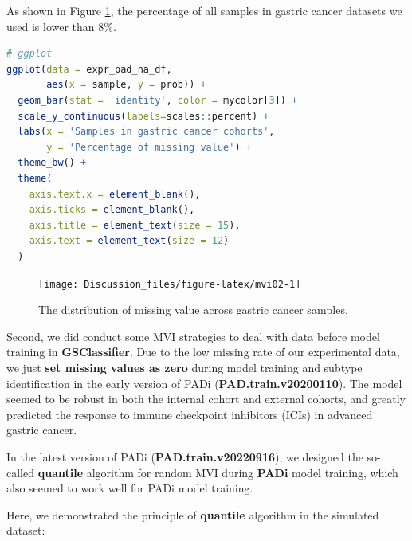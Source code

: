 \documentclass[
  12pt,
]{book}
\begin{document}
As shown in Figure \ref{fig:mvi02}, the percentage of all samples in gastric cancer datasets we used is lower than 8\%.

\begin{lstlisting}[language=R]
# ggplot
ggplot(data = expr_pad_na_df, 
       aes(x = sample, y = prob)) + 
  geom_bar(stat = 'identity', color = mycolor[3]) + 
  scale_y_continuous(labels=scales::percent) + 
  labs(x = 'Samples in gastric cancer cohorts', 
       y = 'Percentage of missing value') + 
  theme_bw() +
  theme(
    axis.text.x = element_blank(),
    axis.ticks = element_blank(),
    axis.title = element_text(size = 15),
    axis.text = element_text(size = 12)
  )
\end{lstlisting}

\begin{figure}

{\centering \texttt{[image: Discussion\_files/figure-latex/mvi02-1]} 

}

\caption{The distribution of missing value across gastric cancer samples.}\label{fig:mvi02}
\end{figure}

Second, we did conduct some MVI strategies to deal with data before model training in \textbf{GSClassifier}. Due to the low missing rate of our experimental data, we just \textbf{set missing values as zero} during model training and subtype identification in the early version of PADi (\textbf{PAD.train.v20200110}). The model seemed to be robust in both the internal cohort and external cohorts, and greatly predicted the response to immune checkpoint inhibitors (ICIs) in advanced gastric cancer.

In the latest version of PADi (\textbf{PAD.train.v20220916}), we designed the so-called \textbf{quantile} algorithm for random MVI during \textbf{PADi} model training, which also seemed to work well for PADi model training.

Here, we demonstrated the principle of \textbf{quantile} algorithm in the simulated dataset:
\end{document}
